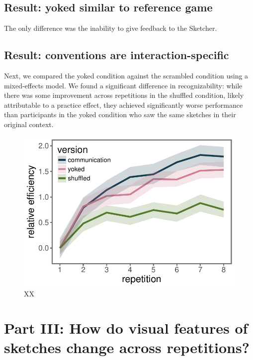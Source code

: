 \documentclass[10pt,letterpaper]{article}
\begin{document}

\subsection{Result: yoked similar to reference game}

The only difference was the inability to give feedback to the Sketcher.

\subsection{Result: conventions are interaction-specific}

Next, we compared the yoked condition against the scrambled condition using a mixed-effects model.
We found a significant difference in recognizability: while there was some improvement across repetitions in the shuffled condition, likely attributable to a practice effect, they achieved significantly worse performance than participants in the yoked condition who saw the same sketches in their original context. 


\begin{figure}
\includegraphics[width=\linewidth]{figures/recog_BIS_timeseries.pdf}
\caption{XX} \label{recog_bis}
\end{figure}

\section{Part III: How do visual features of sketches change across repetitions?}
\end{document}
